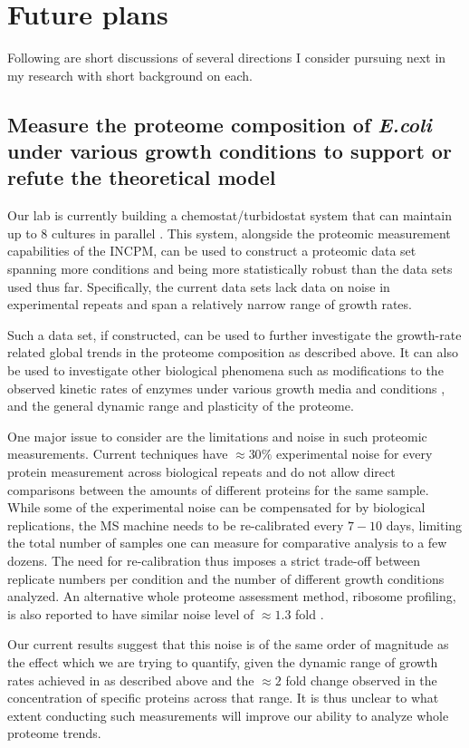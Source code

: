 \documentclass[notitlepage]{article}
\begin{document}
\section{Future plans}
Following are short discussions of several directions I consider pursuing next in my research with short background on each.
\subsection{Measure the proteome composition of \emph{E.coli} under various growth conditions to support or refute the theoretical model}
Our lab is currently building a chemostat/turbidostat system that can maintain up to 8 cultures in parallel \cite{Takahashi2014}.
This system, alongside the proteomic measurement capabilities of the INCPM, can be used to construct a proteomic data set spanning more conditions and being more statistically robust than the data sets used thus far.
Specifically, the current data sets lack data on noise in experimental repeats and span a relatively narrow range of growth rates.

Such a data set, if constructed, can be used to further investigate the growth-rate related global trends in the proteome composition as described above.
It can also be used to investigate other biological phenomena such as modifications to the observed kinetic rates of enzymes under various growth media and conditions \cite{Valgepea2013}, and the general dynamic range and plasticity of the proteome.

One major issue to consider are the limitations and noise in such proteomic measurements.
Current techniques have $\approx 30\%$ experimental noise for every protein measurement across biological repeats and do not allow direct comparisons between the amounts of different proteins for the same sample.
While some of the experimental noise can be compensated for by biological replications, the MS machine needs to be re-calibrated every $7-10$ days, limiting the total number of samples one can measure for comparative analysis to a few dozens.
The need for re-calibration thus imposes a strict trade-off between replicate numbers per condition and the number of different growth conditions analyzed.
An alternative whole proteome assessment method, ribosome profiling, is also reported to have similar noise level of $\approx 1.3$ fold \cite{Li2014}.

Our current results suggest that this noise is of the same order of magnitude as the effect which we are trying to quantify, given the dynamic range of growth rates achieved in \cite{Heinemann2014} as described above and the $\approx 2$ fold change observed in the concentration of specific proteins across that range. 
It is thus unclear to what extent conducting such measurements will improve our ability to analyze whole proteome trends.
\end{document}
